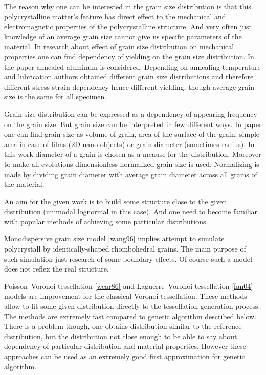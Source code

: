 \documentclass[12pt]{report}
\begin{document}
The reason why one can be interested in the grain size distribution is that this polycrystalline matter's feature has direct effect to the mechanical and electromagnetic properties of the polycrystalline structure. And very often just knowledge of an average grain size cannot give us specific parameters of the material. In research about effect of grain size distribution on mechanical properties \cite{terada10} one can find dependency of yielding on the grain size distribution. In the paper annealed aluminum is considered. Depending on annealing temperature and lubrication authors obtained different grain size distributions and therefore different stress-strain dependency hence different yielding, though average grain size is the same for all specimen.

Grain size distribution can be expressed as a dependency of appearing frequency on the grain size. But grain size can be interpreted in few different ways. In paper one can find grain size as volume of grain, area of the surface of the grain, simple area in case of films (2D nano-objects) or grain diameter (sometimes radius). In this work diameter of a grain is chosen as a meause for the distribution. Moreover to make all evolutions dimensionless normalized grain size is used. Normalizing is made by dividing grain diameter with average grain diameter across all grains of the material. 

An aim for the given work is to build some structure close to the given distribution (unimodal lognormal in this case). And one need to become familiar with popular methods of achieving some particular distributions.

Monodispersive grain size model \ref{wang96} implies attempt to simulate polycrystall by identically-shaped rhombohedral grains. The main purpose of such simulation just research of some boundary effects. Of course such a model does not reflex the real structure.

Poisson–Voronoi tessellation \ref{wear86} and Laguerre–Voronoi tessellation \ref{fan04} models are improvement for the classical Voronoi tessellation. These methods allow to fit some given distribution directly to the tessellation generation process. The methods are extremely fast compared to genetic algorithm described below. There is a problem though, one obtains distribution similar to the reference distribution, but the distribution not close enough to be able to say about dependency of particular distribution and material properties. However these approaches can be used as an extremely good first approximation for genetic algorithm.
\end{document}
